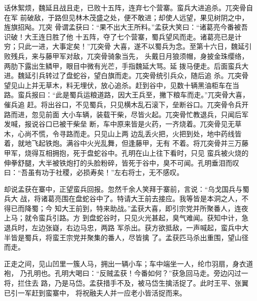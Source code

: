 话休絮烦，魏延且战且走，已败十五阵，连弃七个营寨。蛮兵大进追杀。兀突骨自在军
前破敌，于路但见林木茂盛之处，便不敢进；却使人远望，果见树阴之中，旌旗招飐。兀突
骨谓孟获曰：“果不出大王所料。”孟获大笑曰：“诸葛亮今番被吾识破！大王连日胜了他
十五阵，夺了七个营寨，蜀兵望风而走。诸葛亮已是计穷；只此一进，大事定矣！”兀突骨
大喜，遂不以蜀兵为念。至第十六日，魏延引败残兵，来与藤甲军对敌，兀突骨骑象当先，
头戴日月狼须帽，身披金珠缨络，两肋下露出生鳞甲，眼目中微有光芒，手指魏延大骂。延
拨马便走。后面蛮兵大进。魏延引兵转过了盘蛇谷，望白旗而走。兀突骨统引兵众，随后追
杀。兀突骨望见山上并无草木，料无埋伏，放心追杀。赶到谷中，见数十辆黑油柜车在当
路。蛮兵报曰：“此是蜀兵运粮道路，因大王兵至，撇下粮车而走。”兀突骨大喜，催兵追
赶。将出谷口，不见蜀兵，只见横木乱石滚下，垒断谷口。兀突骨令兵开路而进，忽见前面
大小车辆，装载干柴，尽皆火起。兀突骨忙教退兵，只闻后军发喊，报说谷口已被干柴垒
断，车中原来皆是火药，一齐烧着。兀突骨见无草木，心尚不慌，令寻路而走。只见山上两
边乱丢火把，火把到处，地中药线皆着，就地飞起铁炮。满谷中火光乱舞，但逢藤甲，无有
不着。将兀突骨并三万藤甲军，烧得互相拥抱，死于盘蛇谷中。孔明在山上往下看时，只见
蛮兵被火烧的伸拳舒腿，大半被铁炮打的头脸粉碎，皆死于谷中，臭不可闻。孔明垂泪而叹
曰：“吾虽有功于社稷，必损寿矣！”左右将士，无不感叹。

却说孟获在寨中，正望蛮兵回报。忽然千余人笑拜于寨前，言说：“乌戈国兵与蜀兵大
战，将诸葛亮围在盘蛇谷中了。特请大王前去接应。我等皆是本洞之人，不得已而降蜀；今
知大王前到，特来助战。”孟获大喜，即引宗党并所聚番人，连夜上马；就令蛮兵引路。方
到盘蛇谷时，只见火光甚起，臭气难闻。获知中计，急退兵时，左边张嶷，右边马忠，两路
军杀出。获方欲抵敌，一声喊起，蛮兵中大半皆是蜀兵，将蛮王宗党并聚集的番人，尽皆擒
了。孟获匹马杀出重围，望山径而走。

正走之间，见山凹里一簇人马，拥出一辆小车；车中端坐一人，纶巾羽扇，身衣道袍，
乃孔明也。孔明大喝曰：“反贼孟获！今番如何？”获急回马走。旁边闪过一将，拦住去
路，乃是马岱。孟获措手不及，被马岱生擒活捉了。此时王平、张翼已引一军赶到蛮寨中，
将祝融夫人并一应老小皆活捉而来。

